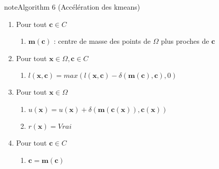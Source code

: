 \documentclass[letterpaper,10pt,english]{jupyterBook}
\begin{document}
\begin{sphinxadmonition}{note}{Algorithm 6 (Accélération des k\sphinxhyphen{}means)}
\begin{enumerate}
\begin{enumerate}
\begin{enumerate}
\begin{enumerate}
\item {} 
\sphinxAtStartPar
Si \(\delta(\mathbf x,\mathbf c)<\delta(\mathbf c(\mathbf x),\mathbf x)\)
\begin{enumerate}
%
\item {} 
\sphinxAtStartPar
\(\mathbf c(\mathbf x)= \mathbf c\)

\end{enumerate}

\end{enumerate}

\end{enumerate}

\item {} 
\sphinxAtStartPar
Pour tout \(\mathbf c\in C\)
\begin{enumerate}
%
\item {} 
\sphinxAtStartPar
\(\mathbf m(\mathbf c)\) : centre de masse des points de \(\Omega\) plus proches de \(\mathbf c\)

\end{enumerate}

\item {} 
\sphinxAtStartPar
Pour tout \(\mathbf x\in \Omega,\mathbf c\in C\)
\begin{enumerate}
%
\item {} 
\sphinxAtStartPar
\(l(\mathbf x,\mathbf c)=max\left (l(\mathbf x,\mathbf c)-\delta(\mathbf m(\mathbf c),\mathbf c),0 \right )\)

\end{enumerate}

\item {} 
\sphinxAtStartPar
Pour tout \(\mathbf x\in \Omega\)
\begin{enumerate}
%
\item {} 
\sphinxAtStartPar
\(u(\mathbf x)=u(\mathbf x)+\delta(\mathbf m(\mathbf c(\mathbf x)),\mathbf c(\mathbf x))\)

\item {} 
\sphinxAtStartPar
\(r(\mathbf x)=Vrai\)

\end{enumerate}

\item {} 
\sphinxAtStartPar
Pour tout \(\mathbf c\in C\)
\begin{enumerate}
%
\item {} 
\sphinxAtStartPar
\(\mathbf c = \mathbf m(\mathbf c)\)

\end{enumerate}

\end{enumerate}

\end{enumerate}
\end{sphinxadmonition}
\end{document}

